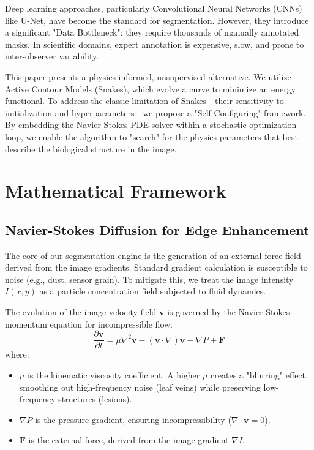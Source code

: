 \documentclass[journal]{IEEEtran}
\begin{document}
Deep learning approaches, particularly Convolutional Neural Networks (CNNs) like U-Net, have become the standard for segmentation. However, they introduce a significant "Data Bottleneck": they require thousands of manually annotated masks. In scientific domains, expert annotation is expensive, slow, and prone to inter-observer variability.

This paper presents a physics-informed, unsupervised alternative. We utilize Active Contour Models (Snakes), which evolve a curve to minimize an energy functional. To address the classic limitation of Snakes—their sensitivity to initialization and hyperparameters—we propose a "Self-Configuring" framework. By embedding the Navier-Stokes PDE solver within a stochastic optimization loop, we enable the algorithm to "search" for the physics parameters that best describe the biological structure in the image.

\section{Mathematical Framework}

\subsection{Navier-Stokes Diffusion for Edge Enhancement}
The core of our segmentation engine is the generation of an external force field derived from the image gradients. Standard gradient calculation is susceptible to noise (e.g., dust, sensor grain). To mitigate this, we treat the image intensity $I(x,y)$ as a particle concentration field subjected to fluid dynamics.

The evolution of the image velocity field $\mathbf{v}$ is governed by the Navier-Stokes momentum equation for incompressible flow:
\begin{equation}
\frac{\partial \mathbf{v}}{\partial t} = \mu \nabla^2 \mathbf{v} - (\mathbf{v} \cdot \nabla)\mathbf{v} - \nabla P + \mathbf{F}
\end{equation}
where:
\begin{itemize}
    \item $\mu$ is the kinematic viscosity coefficient. A higher $\mu$ creates a "blurring" effect, smoothing out high-frequency noise (leaf veins) while preserving low-frequency structures (lesions).
    \item $\nabla P$ is the pressure gradient, ensuring incompressibility ($\nabla \cdot \mathbf{v} = 0$).
    \item $\mathbf{F}$ is the external force, derived from the image gradient $\nabla I$.
\end{itemize}
\end{document}
